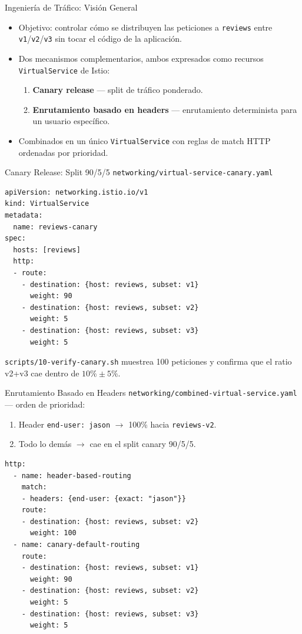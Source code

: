 \documentclass[aspectratio=169]{beamer}
\begin{document}
\begin{frame}{Ingeniería de Tráfico: Visión General}
  \begin{itemize}
    \item Objetivo: controlar cómo se distribuyen las peticiones a \texttt{reviews} entre \texttt{v1}/\texttt{v2}/\texttt{v3} sin tocar el código de la aplicación.
    \item Dos mecanismos complementarios, ambos expresados como recursos \texttt{VirtualService} de Istio:
    \begin{enumerate}
      \item \textbf{Canary release} --- split de tráfico ponderado.
      \item \textbf{Enrutamiento basado en headers} --- enrutamiento determinista para un usuario específico.
    \end{enumerate}
    \item Combinados en un único \texttt{VirtualService} con reglas de match HTTP ordenadas por prioridad.
  \end{itemize}
\end{frame}

\begin{frame}[fragile]{Canary Release: Split 90/5/5}
  \texttt{networking/virtual-service-canary.yaml}
  \begin{lstlisting}[style=yaml]
apiVersion: networking.istio.io/v1
kind: VirtualService
metadata:
  name: reviews-canary
spec:
  hosts: [reviews]
  http:
  - route:
    - destination: {host: reviews, subset: v1}
      weight: 90
    - destination: {host: reviews, subset: v2}
      weight: 5
    - destination: {host: reviews, subset: v3}
      weight: 5
  \end{lstlisting}
  \texttt{scripts/10-verify-canary.sh} muestrea 100 peticiones y confirma que el
  ratio v2+v3 cae dentro de $10\% \pm 5\%$.
\end{frame}

\begin{frame}[fragile]{Enrutamiento Basado en Headers}
  \texttt{networking/combined-virtual-service.yaml} --- orden de prioridad:
  \begin{enumerate}
    \item Header \texttt{end-user: jason} $\to$ 100\% hacia \texttt{reviews-v2}.
    \item Todo lo demás $\to$ cae en el split canary 90/5/5.
  \end{enumerate}
  \begin{lstlisting}[style=yaml]
http:
  - name: header-based-routing
    match:
    - headers: {end-user: {exact: "jason"}}
    route:
    - destination: {host: reviews, subset: v2}
      weight: 100
  - name: canary-default-routing
    route:
    - destination: {host: reviews, subset: v1}
      weight: 90
    - destination: {host: reviews, subset: v2}
      weight: 5
    - destination: {host: reviews, subset: v3}
      weight: 5
  \end{lstlisting}
\end{frame}
\end{document}
